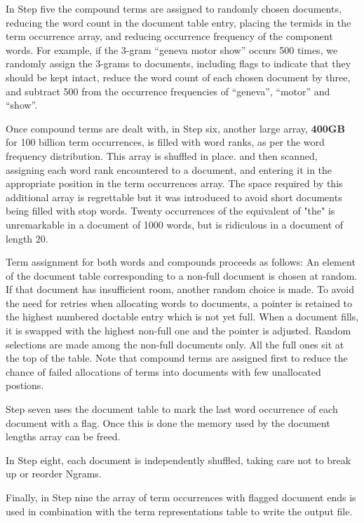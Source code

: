 \documentclass{article}
\begin{document}
In Step five the compound terms are assigned to randomly chosen
documents, reducing the word count in the document table entry,
placing the termids in the term occurrence array, and reducing
occurrence frequency of the component words.  For example, if the
3-gram ``geneva motor show'' occurs 500 times, we randomly assign the
3-grams to documents, including flags to indicate that they should be
kept intact, reduce the word count of each chosen document by three,
and subtract 500 from the occurrence frequencies of ``geneva'',
``motor'' and ``show''.

Once compound terms are dealt with, in Step six, another large array,
\textbf{400GB} for 100 billion term occurrences, is filled with word
ranks, as per the word frequency distribution.  This array is shuffled
in place.
and then scanned, assigning each word rank encountered to a document,
and entering it in the appropriate position in the term occurrences
array.  The space required by this additional array is regrettable but
it was introduced to avoid short documents being filled with stop
words.  Twenty occurrences of the equivalent of "the" is unremarkable
in a document of 1000 words, but is ridiculous in a document of length
20.

Term assignment for both words and compounds proceeds as follows: An
element of the document table corresponding to a non-full document is
chosen at random.  If that document has insufficient room, another
random choice is made. To avoid the need for retries when allocating
words to documents, a pointer is retained to the highest numbered
doctable entry which is not yet full.  When a document fills, it is
swapped with the highest non-full one and the pointer is adjusted.
Random selections are made among the non-full documents only.  All the
full ones sit at the top of the table.  Note that compound terms are
assigned first to reduce the chance of failed allocations of terms
into documents with few unallocated postions.

Step seven uses the document table to mark the last word occurrence
of each document with a flag.  Once this is done the
memory used by the document lengths array can be freed.


In Step eight, each document is independently
shuffled, taking care not to break up or reorder Ngrams.

Finally, in Step nine the array of term occurrences with flagged document ends is
used in combination with the term representations table to write the
output file.
\end{document}
